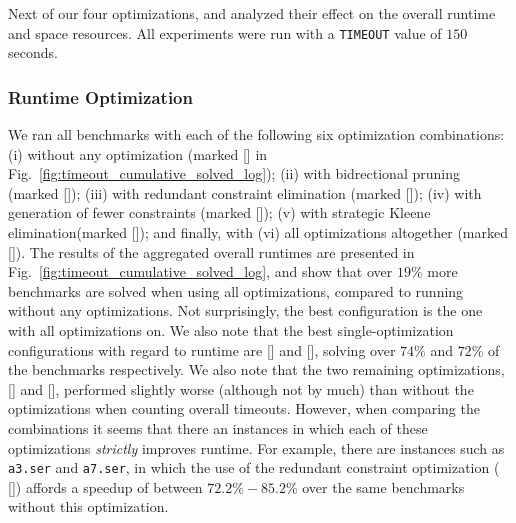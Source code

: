 Next of our four optimizations, and analyzed their effect on the overall runtime and space resources.
%
All experiments were run with a \texttt{TIMEOUT} value of $150$ seconds.

\subsubsection{Runtime Optimization}

We ran all benchmarks with each of the following six optimization combinations: 
(i) without any optimization (marked [\texttt{\textbf{\text{-}\text{-}\text{-}\text{-}}}] in Fig.~\ref{fig:timeout_cumulative_solved_log}); (ii) with bidrectional pruning (marked [\texttt{\textbf{\text{-}\text{-}\text{-}}}]); (iii) with redundant constraint elimination (marked [\texttt{\textbf{\text{-}\text{-}\text{-}}}]); (iv) with generation of fewer constraints (marked [\texttt{\textbf{\text{-}\text{-}\text{-}}}]);
(v) with strategic Kleene elimination(marked [\texttt{\textbf{\text{-}\text{-}\text{-}}}]);
and finally, with (vi) all optimizations altogether (marked [\texttt{\textbf{}}]).
%
The results of the aggregated overall runtimes are presented in Fig.~\ref{fig:timeout_cumulative_solved_log}, and show that over $19\%$ more benchmarks are solved when using all optimizations, compared to running without any optimizations.
%
Not surprisingly, the best configuration is the one with all optimizations on. 
%
We also note that the best single-optimization configurations with regard to runtime are [\texttt{\textbf{\text{-}\text{-}\text{-}}}] and [\texttt{\textbf{\text{-}\text{-}\text{-}}}], solving over $74\%$ and $72\%$ of the benchmarks respectively. 
%
We also note that the two remaining optimizations, [\texttt{\textbf{\text{-}\text{-}\text{-}}}] and [\texttt{\textbf{\text{-}\text{-}\text{-}}}], performed slightly worse (although not by much) than without the optimizations when counting overall timeouts.
%
However, when comparing the combinations it seems that there an instances in which each of these optimizations \textit{strictly} improves runtime.
%
For example, there are instances such as \texttt{a3.ser} and \texttt{a7.ser}, in which the use of the redundant constraint optimization (  [\texttt{\textbf{\text{-}\text{-}\text{-}}}])
affords a speedup of between $72.2\%-85.2\%$ over the same benchmarks without this optimization.



